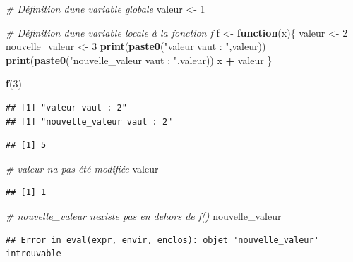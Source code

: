 \documentclass[
  11pt,
]{book}
\newenvironment{Shaded}{\begin{snugshade}}{\end{snugshade}}
\newcommand{\CommentTok}[1]{\textcolor[rgb]{0.56,0.35,0.01}{\textit{#1}}}
\newcommand{\ControlFlowTok}[1]{\textcolor[rgb]{0.13,0.29,0.53}{\textbf{#1}}}
\newcommand{\DecValTok}[1]{\textcolor[rgb]{0.00,0.00,0.81}{#1}}
\newcommand{\KeywordTok}[1]{\textcolor[rgb]{0.13,0.29,0.53}{\textbf{#1}}}
\newcommand{\NormalTok}[1]{#1}
\newcommand{\OperatorTok}[1]{\textcolor[rgb]{0.81,0.36,0.00}{\textbf{#1}}}
\newcommand{\StringTok}[1]{\textcolor[rgb]{0.31,0.60,0.02}{#1}}
\numberwithin{equation}{section}
\numberwithin{countremarque}{section}
\begin{document}
\begin{Shaded}
\begin{Highlighting}[]
\CommentTok{\# Définition d\textquotesingle{}une variable globale}
\NormalTok{valeur \textless{}{-}}\StringTok{ }\DecValTok{1}

\CommentTok{\# Définition d\textquotesingle{}une variable locale à la fonction f}
\NormalTok{f \textless{}{-}}\StringTok{ }\ControlFlowTok{function}\NormalTok{(x)\{}
\NormalTok{  valeur \textless{}{-}}\StringTok{ }\DecValTok{2}
\NormalTok{  nouvelle\_valeur \textless{}{-}}\StringTok{ }\DecValTok{3}
  \KeywordTok{print}\NormalTok{(}\KeywordTok{paste0}\NormalTok{(}\StringTok{"valeur vaut : "}\NormalTok{,valeur))}
  \KeywordTok{print}\NormalTok{(}\KeywordTok{paste0}\NormalTok{(}\StringTok{"nouvelle\_valeur vaut : "}\NormalTok{,valeur))}
\NormalTok{  x }\OperatorTok{+}\StringTok{ }\NormalTok{valeur}
\NormalTok{\}}

\KeywordTok{f}\NormalTok{(}\DecValTok{3}\NormalTok{)}
\end{Highlighting}
\end{Shaded}

\begin{lstlisting}
## [1] "valeur vaut : 2"
## [1] "nouvelle_valeur vaut : 2"
\end{lstlisting}

\begin{lstlisting}
## [1] 5
\end{lstlisting}

\begin{Shaded}
\begin{Highlighting}[]
\CommentTok{\# valeur n\textquotesingle{}a pas été modifiée}
\NormalTok{valeur}
\end{Highlighting}
\end{Shaded}

\begin{lstlisting}
## [1] 1
\end{lstlisting}

\begin{Shaded}
\begin{Highlighting}[]
\CommentTok{\# nouvelle\_valeur n\textquotesingle{}existe pas en dehors de f()}
\NormalTok{nouvelle\_valeur}
\end{Highlighting}
\end{Shaded}

\begin{lstlisting}
## Error in eval(expr, envir, enclos): objet 'nouvelle_valeur' introuvable
\end{lstlisting}
\end{document}
